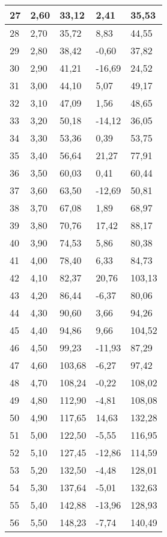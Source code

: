 \documentclass{article}
\begin{document}
\begin{longtable}{|l|l|l|l|l|}
    27 & 2,60 & 33,12 & 2,41 & 35,53 \\ \hline
    28 & 2,70 & 35,72 & 8,83 & 44,55 \\ \hline
    29 & 2,80 & 38,42 & -0,60 & 37,82 \\ \hline
    30 & 2,90 & 41,21 & -16,69 & 24,52 \\ \hline
    31 & 3,00 & 44,10 & 5,07 & 49,17 \\ \hline
    32 & 3,10 & 47,09 & 1,56 & 48,65 \\ \hline
    33 & 3,20 & 50,18 & -14,12 & 36,05 \\ \hline
    34 & 3,30 & 53,36 & 0,39 & 53,75 \\ \hline
    35 & 3,40 & 56,64 & 21,27 & 77,91 \\ \hline
    36 & 3,50 & 60,03 & 0,41 & 60,44 \\ \hline
    37 & 3,60 & 63,50 & -12,69 & 50,81 \\ \hline
    38 & 3,70 & 67,08 & 1,89 & 68,97 \\ \hline
    39 & 3,80 & 70,76 & 17,42 & 88,17 \\ \hline
    40 & 3,90 & 74,53 & 5,86 & 80,38 \\ \hline
    41 & 4,00 & 78,40 & 6,33 & 84,73 \\ \hline
    42 & 4,10 & 82,37 & 20,76 & 103,13 \\ \hline
    43 & 4,20 & 86,44 & -6,37 & 80,06 \\ \hline
    44 & 4,30 & 90,60 & 3,66 & 94,26 \\ \hline
    45 & 4,40 & 94,86 & 9,66 & 104,52 \\ \hline
    46 & 4,50 & 99,23 & -11,93 & 87,29 \\ \hline
    47 & 4,60 & 103,68 & -6,27 & 97,42 \\ \hline
    48 & 4,70 & 108,24 & -0,22 & 108,02 \\ \hline
    49 & 4,80 & 112,90 & -4,81 & 108,08 \\ \hline
    50 & 4,90 & 117,65 & 14,63 & 132,28 \\ \hline
    51 & 5,00 & 122,50 & -5,55 & 116,95 \\ \hline
    52 & 5,10 & 127,45 & -12,86 & 114,59 \\ \hline
    53 & 5,20 & 132,50 & -4,48 & 128,01 \\ \hline
    54 & 5,30 & 137,64 & -5,01 & 132,63 \\ \hline
    55 & 5,40 & 142,88 & -13,96 & 128,93 \\ \hline
    56 & 5,50 & 148,23 & -7,74 & 140,49 \\ \hline

\end{longtable}
\end{document}
